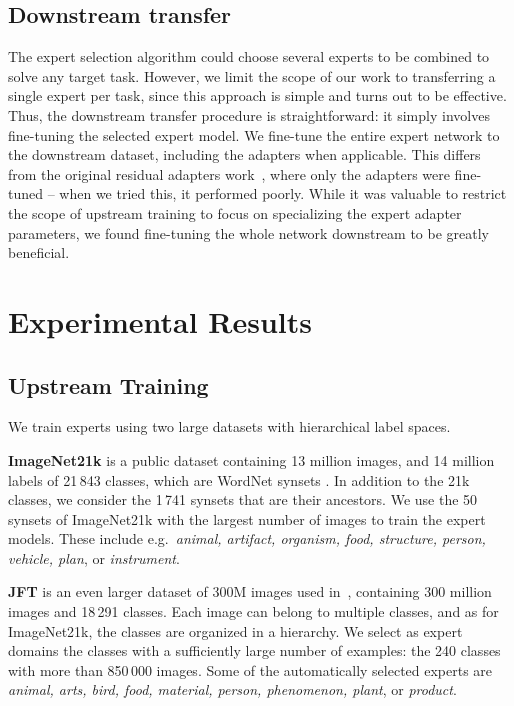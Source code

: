 \documentclass{article}
\newcommand{\JFT}{{JFT}\xspace}
\begin{document}
\subsection{Downstream transfer}
The expert selection algorithm could choose several experts to
be combined to solve any target task. 
However, we limit the scope of our work to transferring a single expert per task, since this approach is simple and turns out to be effective.
Thus, the downstream transfer procedure is straightforward: it simply involves fine-tuning 
the selected expert model.
We fine-tune the entire expert network to the downstream dataset, including the adapters when applicable.
This differs from the original residual adapters work~\cite{rebuffi2017learning}, where only the adapters were fine-tuned -- 
when we tried this, it performed poorly.
While it was valuable to restrict the scope of upstream training to focus on specializing the expert adapter parameters, we found fine-tuning the whole network downstream to be greatly beneficial.
 \section{Experimental Results}
\label{sec:experiments}


\subsection{Upstream Training}
\label{subsec:exp_upstream}
We train experts using two large datasets with hierarchical label spaces.

\textbf{ImageNet21k} \cite{deng2009imagenet} is a public dataset containing 13 million images, and 14 million labels of 21\,843 classes, which are WordNet synsets \cite{fellbaum2012wordnet}.
In addition to the 21k classes, we consider the 1\,741 synsets that are their ancestors.
We use the 50 synsets of ImageNet21k with the largest number of images to train the expert models. 
These include e.g.\ \emph{animal, artifact, organism, food, structure, person, vehicle, plan}, or \emph{instrument}.

\textbf{\JFT} is an even larger dataset of 300M images used in~\cite{chollet2017xception, hinton2015distilling, ngiam2018domain, sun2017revisiting},
containing 300 million images and 18\,291 classes.
Each image can belong to multiple classes, and as for ImageNet21k, the classes are organized
in a hierarchy.
We select as expert domains the classes with a sufficiently large number of examples:
the 240 classes with more than 850\,000 images. Some of the automatically selected experts are 
\emph{animal, arts, bird, food, material, person, phenomenon, plant}, or \emph{product}.
\end{document}
